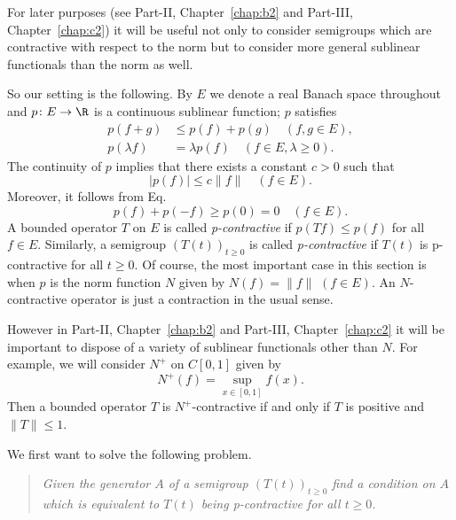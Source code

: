 For later purposes (see Part-II, Chapter~\ref{chap:b2} and Part-III, Chapter~\ref{chap:c2}) it will be useful not only to consider semigroups which are contractive with respect to the norm but to consider more general sublinear functionals than the norm as well.

So our setting is the following.
By $E$ we denote a real Banach space throughout and $p \colon E \to \R$ is a continuous sublinear function; \ie $p$ satisfies
\begin{equation}\label{eq:a2-2.1}
\begin{split}
p(f+g) &\leq p(f) + p(g) \quad (f, g \in E), \\%
p(\lambda f) &= \lambda p(f) \quad (f \in E, \lambda \geq 0). %
\end{split}
\end{equation}
The continuity of\/ $p$ implies that there exists a constant $c > 0$ such that
\begin{equation}\label{eq:a2-2.3}
	|p(f)| \leq c\|f\| \quad (f \in E).
\end{equation}
Moreover, it follows from Eq.~ 
\begin{equation*}\label{eq:a2-2.4}
	p(f) + p(-f) \geq p(0) = 0 \quad (f \in E).
\end{equation*}
A bounded operator $T$ on $E$ is called \emph{p-contractive} if\/ $p(Tf) \leq p(f)$ for all $f \in E$.
Similarly, a semigroup $(T(t))_{t\geq 0}$ is called \emph{p-contractive} if\/ $T(t)$ is p-contractive for all $t \geq 0$.
Of course, the most important case in this section is when $p$ is the norm function $N$ given by $N(f) = \|f\|$ $(f \in E)$.
An $N$-contractive operator is just a contraction in the usual sense.
\begin{remark*} \label{rem:a2-2.1-kgk}
However in Part-II, Chapter~\ref{chap:b2} and Part-III, Chapter~\ref{chap:c2} it will be important to dispose of a variety of sublinear functionals other than $N$.
For example, we will consider $N^{+}$ on $C[0,1]$ given by 
%
\[
	N^{+}(f) = \sup_{x \in [0,1]} f(x) .
\]
%
Then a bounded operator $T$ is $N^{+}$-contractive if and only if\/ $T$ is positive and $\|T\| \leq 1$.
\end{remark*}
We first want to solve the following problem.
\begin{quote}
\textit{Given the generator $A$ of a semigroup $(T(t))_{t\geq 0}$ find a condition on $A$ which is equivalent to $T(t)$ being p-contractive for all $t \geq 0$.}
\end{quote}
